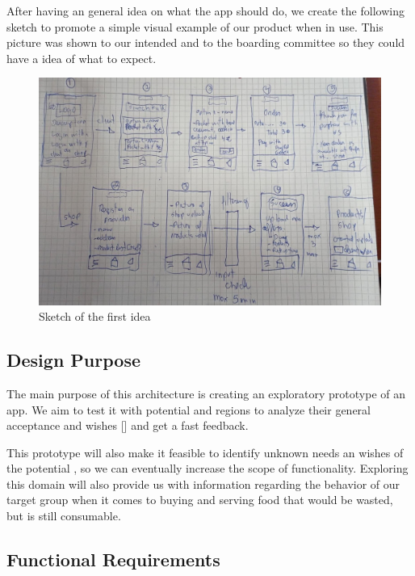 After having an general idea on what the \gls{app} should do, we create the following \gls{sketch} to promote a simple visual 
example of our product when in use. This picture was shown to our intended  and to the boarding committee 
so they could have a idea of what to expect.
 
\begin{figure}[H]
    \centering
    \includegraphics[width=1\textwidth]{assets/sketch.jpeg}
    \caption{Sketch of the first idea}
    \label{fig:sketch}
\end{figure}


\subsection{Design Purpose}

The main purpose of this architecture is creating an exploratory prototype of an \gls{app}. We aim to test it with potential 
 and regions to analyze their general acceptance and wishes [\cite{refbook:DSHC}] and get a fast feedback. 

This prototype will also make it feasible to identify unknown needs an wishes of the potential , so we 
can eventually increase the scope of functionality. Exploring this domain will also provide us with information regarding 
the behavior of our target group when it comes to buying and serving food that would be wasted, but is still consumable.


\newpage
\subsection{Functional Requirements} \label{Requirement_Overview}


